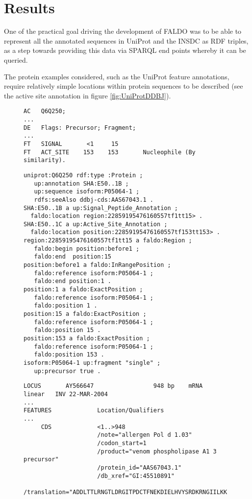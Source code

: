\section*{Results}
One of the practical goal driving the development of FALDO was to be able
to represent all the annotated sequences in UniProt and the INSDC as RDF
triples, as a step towards providing this data via SPARQL end points whereby
it can be queried.

The protein examples considered, such as the UniProt feature annotations,
require relatively simple locations within protein sequences to be described (see the active site annotation in figure \ref{fig:UniProtDDBJ}).

\begin{figure}
\begin{shaded}
\begin{verbatim}
AC   Q6Q250;
...
DE   Flags: Precursor; Fragment;
...
FT   SIGNAL       <1     15
FT   ACT_SITE    153    153       Nucleophile (By similarity).
\end{verbatim}
\begin{verbatim}
uniprot:Q6Q250 rdf:type :Protein ;
   up:annotation SHA:E50..1B ;
   up:sequence isoform:P05064-1 ;
   rdfs:seeAlso ddbj-cds:AAS67043.1 .
SHA:E50..1B a up:Signal_Peptide_Annotation ;
  faldo:location region:22859195476160557tf1tt15> .
SHA:E50..1C a up:Active_Site_Annotation ;
  faldo:location position:22859195476160557tf153tt153> .
region:22859195476160557tf1tt15 a faldo:Region ;
   faldo:begin position:before1 ;
   faldo:end  position:15
position:before1 a faldo:InRangePosition ;
   faldo:reference isoform:P05064-1 ;
   faldo:end position:1 . 
position:1 a faldo:ExactPosition ;
   faldo:reference isoform:P05064-1 ;
   faldo:position 1 .
position:15 a faldo:ExactPosition ;
   faldo:reference isoform:P05064-1 ;
   faldo:position 15 .   
position:153 a faldo:ExactPosition ;
   faldo:reference isoform:P05064-1 ;
   faldo:position 153 .
isoform:P05064-1 up:fragment "single" ;
   up:precursor true .
\end{verbatim}
\begin{verbatim}
LOCUS       AY566647                 948 bp    mRNA    linear   INV 22-MAR-2004
...
FEATURES             Location/Qualifiers
...
     CDS             <1..>948
                     /note="allergen Pol d 1.03"
                     /codon_start=1
                     /product="venom phospholipase A1 3 precursor"
                     /protein_id="AAS67043.1"
                     /db_xref="GI:45510891"
                     /translation="ADDLTTLRNGTLDRGITPDCTFNEKDIELHVYSRDKRNGIILKK

\end{verbatim}
\end{shaded}
\end{figure}

